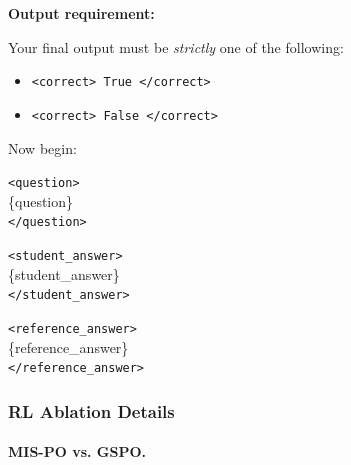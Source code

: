 \begin{MyBox}{}
\textbf{Output requirement:}

Your final output must be \emph{strictly} one of the following:
\begin{itemize}[itemsep=0pt, parsep=0pt, topsep=0pt]
  \item \texttt{<correct> True </correct>}
  \item \texttt{<correct> False </correct>}
\end{itemize}

Now begin:

\texttt{<question>}\\
\{question\}\\
\texttt{</question>}

\texttt{<student\_answer>}\\
\{student\_answer\}\\
\texttt{</student\_answer>}

\texttt{<reference\_answer>}\\
\{reference\_answer\}\\
\texttt{</reference\_answer>}
\end{MyBox}


\subsubsection{RL Ablation Details} \label{sec:rl_ab}
\paragraph{MIS-PO vs. GSPO.}


